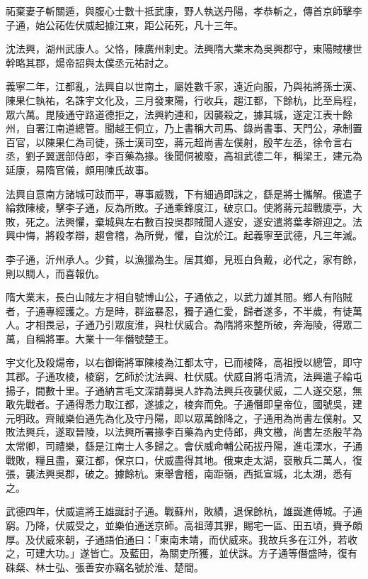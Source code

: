 \begin{pinyinscope}
 祏棄妻子斬關遁，與腹心士數十抵武康，野人執送丹陽，孝恭斬之，傳首京師擊李子通，始公祏佐伏威起據江東，距公祏死，凡十三年。



 沈法興，湖州武康人。父恪，陳廣州刺史。法興隋大業末為吳興郡守，東陽賊樓世幹略其郡，煬帝詔與太僕丞元祐討之。



 義寧二年，江都亂，法興自以世南土，屬姓數千家，遠近向服，乃與祐將孫士漢、陳果仁執祐，名誅宇文化及，三月發東陽，行收兵，趨江都，下餘杭，比至烏程，眾六萬。毘陵通守路道德拒之，法興約連和，因襲殺之，據其城，遂定江表十餘州，自署江南道總管。聞越王侗立，乃上書稱大司馬、錄尚書事、天門公，承制置百官，以陳果仁為司徒，孫士漢司空，蔣元超尚書左僕射，殷芊左丞，徐令言右丞，劉子翼選部侍郎，李百藥為掾。後聞侗被廢，高祖武德二年，稱梁王，建元為延康，易隋官儀，頗用陳氏故事。



 法興自意南方諸城可跂而平，專事威戮，下有細過即誅之，繇是將士攜解。俄遣子綸救陳棱，擊李子通，反為所敗。子通乘鋒度江，破京口。使將蔣元超戰庱亭，大敗，死之。法興懼，棄城與左右數百投吳郡賊聞人遂安，遂安遣將葉孝辯迎之。法興中悔，將殺孝辯，趨會稽，為所覺，懼，自沈於江。起義寧至武德，凡三年滅。



 李子通，沂州承人。少貧，以漁獵為生。居其鄉，見班白負戴，必代之，家有餘，則以賙人，而喜報仇。



 隋大業末，長白山賊左才相自號博山公，子通依之，以武力雄其間。鄉人有陷賊者，子通專經護之。方是時，群盜暴忍，獨子通仁愛，歸者遂多，不半歲，有徒萬人。才相畏忌，子通乃引眾度淮，與杜伏威合。為隋將來整所破，奔海陵，得眾二萬，自稱將軍。大業十一年僭號楚王。



 宇文化及殺煬帝，以右御衛將軍陳棱為江都太守，已而棱降，高祖授以總管，即守其郡。子通攻棱，棱窮，乞師於沈法興、杜伏威。伏威自將屯清流，法興遣子綸屯揚子，間數十里。子通納言毛文深請募吳人詐為法興兵夜襲伏威，二人遂交惡，無敢先戰者。子通得悉力取江都，遂據之，棱奔而免。子通僭即皇帝位，國號吳，建元明政。齊賊樂伯通先為化及守丹陽，即以眾萬餘降之，子通用為尚書左僕射。又敗法興兵，遂取晉陵，以法興所署掾李百藥為內史侍郎，典文檄，尚書左丞殷芊為太常卿，司禮樂，繇是江南士人多歸之。會伏威命輔公祏拔丹陽，進屯溧水，子通戰敗，糧且盡，棄江都，保京口，伏威盡得其地。俄東走太湖，裒散兵二萬人，復張，襲法興吳郡，破之。據餘杭。東舉會稽，南距嶺，西抵宣城，北太湖，悉有之。



 武德四年，伏威遣將王雄誕討子通。戰蘇州，敗績，退保餘杭，雄誕進傅城。子通窮。乃降，伏威受之，並樂伯通送京師。高祖薄其罪，賜宅一區、田五頃，賚予頗厚。及伏威來朝，子通語伯通曰：「東南未靖，而伏威來。我故兵多在江外，若收之，可建大功。」遂皆亡。及藍田，為關吏所獲，並伏誅。方子通等僭盛時，復有硃粲、林士弘、張善安亦竊名號於淮、楚間。




\end{pinyinscope}
